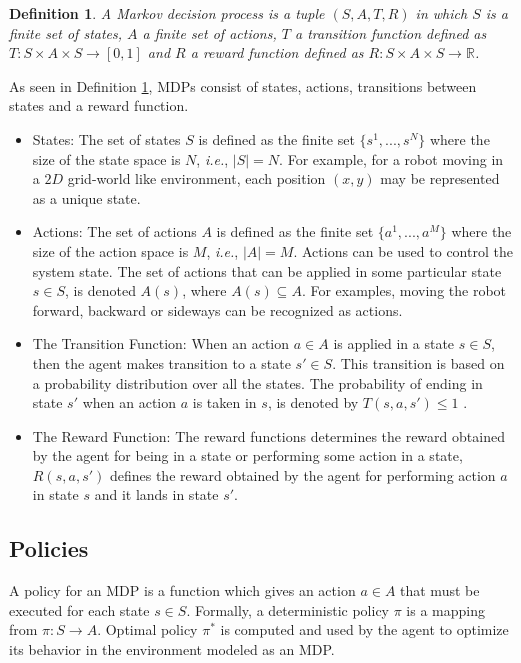 \documentclass[12pt]{report}
\newtheorem{mydef}{Definition}
\newcommand{\ie}{\textit{i.e.}}
\begin{document}
\begin{mydef}
\label{mdp_def}
A Markov decision process is a tuple $(S, A, T, R)$ in which $S$ is a finite set of states, $A$ a finite set of actions, $T$ a transition function defined as $T : S \times A \times S \rightarrow [0, 1]$ and $R$ a reward function defined
as $R : S \times A \times S \rightarrow \mathbb{R}$.
\end{mydef}

As seen in Definition \ref{mdp_def}, MDPs consist of states, actions, transitions between states and a reward function.
\begin{itemize}
\item States: The set of states $S$ is defined as the finite set $\{s^1,...,s^N\}$ where the size of the state space is $N$, \ie, $|S| = N$. For example, for a robot moving in a $2D$ grid-world like environment, each position $(x,y)$ may be represented as a unique state.

\item Actions: The set of actions $A$ is defined as the finite set $\{a^1,...,a^M\}$ where the size of the action space is $M$, \ie, $|A| = M$. Actions can be used to control the system state. The set of actions that can be applied in some particular state $s \in S$, is denoted $A(s)$,
where $A(s) \subseteq A$. For examples, moving the robot forward, backward or sideways can be recognized as actions.

\item The Transition Function: 
\label{transition_function}
When an action $a \in A$ is applied in a state $s \in S$, then the agent makes transition to a state $s' \in S$. This transition is based on a probability distribution over all the states. The probability of ending in state $s'$ when an action $a$ is taken in $s$, is denoted by $T(s,a,s') \leq 1$ .

 \item The Reward Function:
\label{reward_function}
The reward functions determines the reward obtained by the agent for being in a state or performing some action in a state, $R(s,a,s')$ defines the reward obtained by the agent for performing action $a$ in state $s$ and it lands in state $s'$.
\end{itemize}

\subsection{Policies}
\label{policies}
A policy for an MDP is a function which gives an action $a \in A$ that must be executed for each state $s \in S$. Formally, a deterministic policy $\pi$ is a mapping from $\pi: S \rightarrow A$. Optimal policy $\pi^*$ is computed and used by the agent to optimize its behavior in the environment modeled as an MDP.
\end{document}
